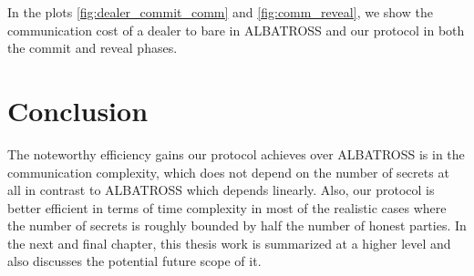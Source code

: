 In the plots \ref{fig:dealer_commit_comm} and \ref{fig:comm_reveal}, we show the communication cost of a dealer to bare 
in ALBATROSS and our protocol in both the commit and reveal phases.





\section{Conclusion}
The noteworthy efficiency gains our protocol achieves over ALBATROSS is in the communication 
complexity, which does not depend on the number of secrets at all in contrast to ALBATROSS 
which depends linearly. Also, our protocol is better efficient in terms of time complexity in 
most of the realistic cases where the number of secrets is roughly bounded by half the number of 
honest parties. In the next and final chapter, this thesis work is summarized at a higher level 
and also discusses the potential future scope of it.


